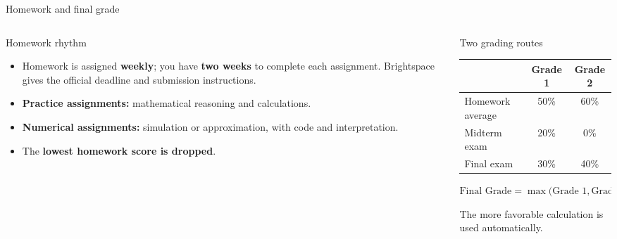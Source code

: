 \documentclass[handout,10pt,aspectratio=169]{beamer}
\begin{document}
\begin{frame}{Homework and final grade}
\scriptsize

\begin{columns}[T,onlytextwidth]
  \begin{column}{0.48\textwidth}
    \begin{block}{Homework rhythm}
      \begin{itemize}\setlength{\itemsep}{0.12em}
        \item Homework is assigned \textbf{weekly}; you have \textbf{two weeks}
        to complete each assignment. Brightspace gives the official deadline
        and submission instructions.
        \item \textbf{Practice assignments:} mathematical reasoning and calculations.
        \item \textbf{Numerical assignments:} simulation or approximation,
        with code and interpretation.
        \item The \textbf{lowest homework score is dropped}.
      \end{itemize}
    \end{block}
  \end{column}

  \begin{column}{0.48\textwidth}
    \begin{block}{Two grading routes}
      \centering
      \renewcommand{\arraystretch}{0.95}
      \begin{tabular}{@{}lcc@{}}
        \toprule
        & \textbf{Grade 1} & \textbf{Grade 2} \\
        \midrule
        Homework average & 50\% & 60\% \\
        Midterm exam     & 20\% & 0\%  \\
        Final exam       & 30\% & 40\% \\
        \bottomrule
      \end{tabular}

      \vspace{0.35em}
      {\normalsize
      $\text{Final Grade}=\max\bigl(\text{Grade 1},\text{Grade 2}\bigr)$
      }\par
      \vspace{0.1em}
      The more favorable calculation is used automatically.
    \end{block}
  \end{column}
\end{columns}

\vspace{-0.15em}


\end{frame}
\end{document}
